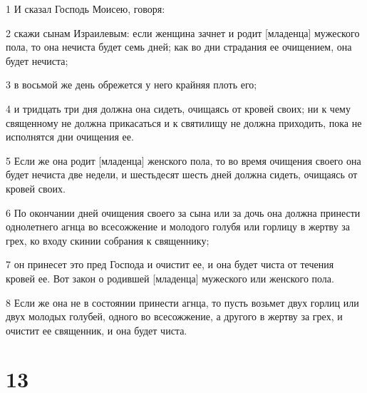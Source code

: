\par 1 И сказал Господь Моисею, говоря:
\par 2 скажи сынам Израилевым: если женщина зачнет и родит [младенца] мужеского пола, то она нечиста будет семь дней; как во дни страдания ее очищением, она будет нечиста;
\par 3 в восьмой же день обрежется у него крайняя плоть его;
\par 4 и тридцать три дня должна она сидеть, очищаясь от кровей своих; ни к чему священному не должна прикасаться и к святилищу не должна приходить, пока не исполнятся дни очищения ее.
\par 5 Если же она родит [младенца] женского пола, то во время очищения своего она будет нечиста две недели, и шестьдесят шесть дней должна сидеть, очищаясь от кровей своих.
\par 6 По окончании дней очищения своего за сына или за дочь она должна принести однолетнего агнца во всесожжение и молодого голубя или горлицу в жертву за грех, ко входу скинии собрания к священнику;
\par 7 он принесет это пред Господа и очистит ее, и она будет чиста от течения кровей ее. Вот закон о родившей [младенца] мужеского или женского пола.
\par 8 Если же она не в состоянии принести агнца, то пусть возьмет двух горлиц или двух молодых голубей, одного во всесожжение, а другого в жертву за грех, и очистит ее священник, и она будет чиста.

\chapter{13}

